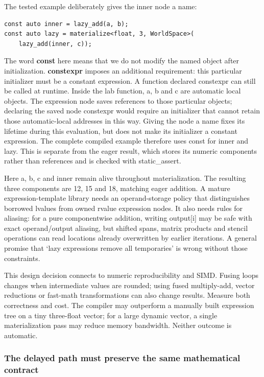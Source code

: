 The tested example deliberately gives the inner node a name:

\begin{verbatim}
const auto inner = lazy_add(a, b);
const auto lazy = materialize<float, 3, WorldSpace>(
    lazy_add(inner, c));
\end{verbatim}

The word \textbf{const} here means that we do not modify the named object after initialization. \textbf{constexpr} imposes an additional requirement: this particular initializer must be a constant expression. A function declared constexpr can still be called at runtime. Inside the lab function, a, b and c are automatic local objects. The expression node saves references to those particular objects; declaring the saved node constexpr would require an initializer that cannot retain those automatic-local addresses in this way. Giving the node a name fixes its lifetime during this evaluation, but does not make its initializer a constant expression. The complete compiled example therefore uses const for inner and lazy. This is separate from the eager result, which stores its numeric components rather than references and is checked with static\_assert.

Here a, b, c and inner remain alive throughout materialization. The resulting three components are 12, 15 and 18, matching eager addition. A mature expression-template library needs an operand-storage policy that distinguishes borrowed lvalues from owned rvalue expression nodes. It also needs rules for aliasing: for a pure componentwise addition, writing output{[}i{]} may be safe with exact operand/output aliasing, but shifted spans, matrix products and stencil operations can read locations already overwritten by earlier iterations. A general promise that `lazy expressions remove all temporaries' is wrong without those constraints.

This design decision connects to numeric reproducibility and SIMD. Fusing loops changes when intermediate values are rounded; using fused multiply-add, vector reductions or fast-math transformations can also change results. Measure both correctness and cost. The compiler may outperform a manually built expression tree on a tiny three-float vector; for a large dynamic vector, a single materialization pass may reduce memory bandwidth. Neither outcome is automatic.

\subsubsection{The delayed path must preserve the same mathematical contract}\label{the-delayed-path-must-preserve-the-same-mathematical-contract}

